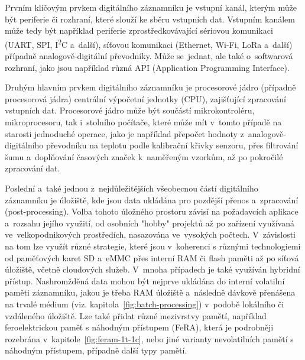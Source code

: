 Prvním klíčovým prvkem digitálního záznamníku je vstupní kanál, kterým může být periferie či rozhraní, které slouží ke sběru vstupních dat. Vstupním kanálem může tedy být například periferie zprostředkovávající sériovou komunikaci (UART, SPI, I\textsuperscript{2}C a~další), síťovou komunikaci (Ethernet, Wi-Fi, LoRa a~další) případně analogově-digitální převodníky. Může se~jednat, ale také o~softwarová rozhraní, jako jsou například různá API (Application Programming Interface).~\cite{ researchgate_general_dataloggger_multiple_sdcards, ieee_digital_sound_recorder_arm_sd_card}

Druhým hlavním prvkem digitálního záznamníku je procesorové jádro (případně procesorová jádra) centrální výpočetní jednotky (CPU), zajišťující zpracování vstupních dat. Procesorové jádro může být součástí mikrokontroléru, mikroprocesoru, tak i~stolního počítače, které může mít v~tomto případě na starosti jednoduché operace, jako je například přepočet hodnoty z~analogově-digitálního převodníku na teplotu podle kalibrační křivky senzoru, přes filtrování šumu a~doplňování časových značek k~naměřeným vzorkům, až po pokročilé zpracování dat.~\cite{smart_datalogger_data_acquisition_cpu, researchgate_general_dataloggger_multiple_sdcards, springer_development_ECG_recorder}

\newpage

Poslední a~také jednou z~nejdůležitějších všeobecnou částí digitálního záznamníku je úložiště, kde jsou data ukládána pro pozdější přenos a~zpracování (post-processing). Volba tohoto úložného prostoru závisí na požadavcích aplikace a~rozsahu jejího využití, od osobních "hobby" projektů až po zařízení využívaná ve~velkopodnikových prostředích, nasazována ve~vysokých počtech. V~závislosti na tom lze využít různé strategie, které jsou v~koherenci s různými technologiemi od paměťových karet SD a~eMMC přes interní RAM či flash paměti až po síťová úložiště, včetně cloudových služeb. V~mnoha případech je také využíván hybridní přístup. Nashromžděná data mohou být nejprve ukládána do interní volatilní paměti záznamníku, jakou je třeba RAM úložiště a~následně dávkově přenášena na trvalé médium (viz. kapitola~\ref{fig:batch-processing}) v~podobě lokálního či vzdáleného úložiště. Lze také přidat různé mezivrstvy pamětí, například feroelektrickou paměť s náhodným přístupem (FeRA), která je podrobněji rozebrána v~kapitole~\ref{fig:feram-1t-1c}, nebo jiné varianty nevolatilních pamětí s náhodným přístupem, případně další typy pamětí.~\cite{datalogger_sd_mmc_usb_flash_disk, researchgate_general_dataloggger_multiple_sdcards, rta_local_vs_cloud}


